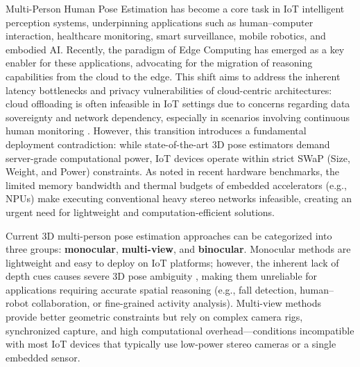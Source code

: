 \documentclass[journal]{IEEEtran}
\begin{document}
 Multi-Person Human Pose Estimation has become a core task in IoT intelligent perception systems, underpinning applications such as human–computer interaction, healthcare monitoring, smart surveillance, mobile robotics, and embodied AI. Recently, the paradigm of  Edge Computing has emerged as a key enabler for these applications, advocating for the migration of reasoning capabilities from the cloud to the edge. This shift aims to address the inherent latency bottlenecks and privacy vulnerabilities of cloud-centric architectures: cloud offloading is often infeasible in IoT settings due to concerns regarding data sovereignty and network dependency, especially in scenarios involving continuous human monitoring . However, this transition introduces a fundamental deployment contradiction: while state-of-the-art 3D pose estimators  demand server-grade computational power, IoT devices operate within strict SWaP (Size, Weight, and Power) constraints. As noted in recent hardware benchmarks, the limited memory bandwidth and thermal budgets of embedded accelerators (e.g., NPUs) make executing conventional heavy stereo networks infeasible, creating an urgent need for lightweight and computation-efficient solutions.

Current 3D multi-person pose estimation approaches can be categorized into three groups: \textbf{monocular}, \textbf{multi-view}, and \textbf{binocular}. Monocular methods  are lightweight and easy to deploy on IoT platforms; however, the inherent lack of depth cues causes severe 3D pose ambiguity , making them unreliable for applications requiring accurate spatial reasoning (e.g., fall detection, human–robot collaboration, or fine-grained activity analysis). Multi-view methods  provide better geometric constraints but rely on complex camera rigs, synchronized capture, and high computational overhead—conditions incompatible with most IoT devices that typically use low-power stereo cameras or a single embedded sensor.
\end{document}
